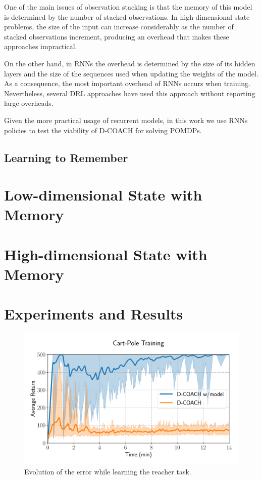One of the main issues of observation stacking is that the memory of this model is determined by the number of stacked observations. In high-dimensional state problems, the size of the input can increase considerably as the number of stacked observations increment, producing an overhead that makes these approaches impractical. 

On the other hand, in RNNs the overhead is determined by the size of its hidden layers and the size of the sequences used when updating the weights of the model. As a consequence, the most important overhead of RNNs occurs when training. Nevertheless, several DRL approaches have used this approach without reporting large overheads.

Given the more practical usage of recurrent models, in this work we use RNNs policies to test the viability of D-COACH for solving POMDPs. 

\subsection{Learning to Remember}

\section{Low-dimensional State with Memory}


\section{High-dimensional State with Memory}

\section{Experiments and Results}

\begin{figure}[h]
    \centering
    \includegraphics[width=0.9\linewidth]{imagenes/cap3/cartpole_LD_model.pdf}
    \caption{Evolution of the error while learning the reacher task. }
    \label{fig:reacher_exp}
\end{figure}

